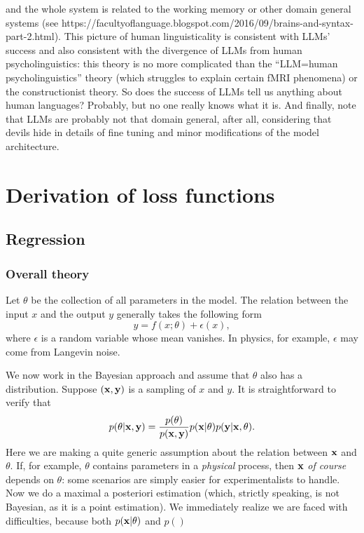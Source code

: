 \documentclass[hyperref, a4paper, 12pt]{report}
\begin{document}
and the whole system is related to the working memory or other domain general systems (see https://facultyoflanguage.blogspot.com/2016/09/brains-and-syntax-part-2.html).
This picture of human linguisticality is consistent with LLMs' success
and also consistent with the divergence of LLMs from human psycholinguistics:
this theory is no more complicated than the ``LLM=human psycholinguistics'' theory (which struggles to explain certain fMRI phenomena) or the constructionist theory.
So does the success of LLMs tell us anything about human languages?
Probably, but no one really knows what it is.
And finally, note that LLMs are probably not that domain general, after all,
considering that devils hide in details of fine tuning and minor modifications of the model architecture.

\chapter{Derivation of loss functions}\label{chap:loss}

\section{Regression}

\subsection{Overall theory}

Let $\theta$ be the collection of all parameters in the model.
The relation between the input $x$ and the output $y$ generally takes the following form
\begin{equation}
    y = f(x; \theta) + \epsilon(x),
\end{equation}
where $\epsilon$ is a random variable whose mean vanishes.
In physics, for example, $\epsilon$ may come from Langevin noise.

We now work in the Bayesian approach and assume that $\theta$ also has a distribution.
Suppose $(\vb{x}, \vb{y})$ is a sampling of $x$ and $y$.
It is straightforward to verify that
\begin{equation}
    p(\theta | \vb{x}, \vb{y}) = \frac{p(\theta)}{p(\vb{x}, \vb{y})} p(\vb{x} | \theta) p(\vb{y} | \vb{x}, \theta).
\end{equation}
Here we are making a quite generic assumption about the relation between $\vb{x}$ and $\theta$.
If, for example, $\theta$ contains parameters in a \emph{physical} process,
then $\vb{x}$ \emph{of course} depends on $\theta$:
some scenarios are simply easier for experimentalists to handle.
Now we do a maximal a posteriori estimation (which, strictly speaking, is not Bayesian, as it is a point estimation).
We immediately realize we are faced with difficulties,
because both $p(\vb{x} | \theta)$ and $p()$
\end{document}
